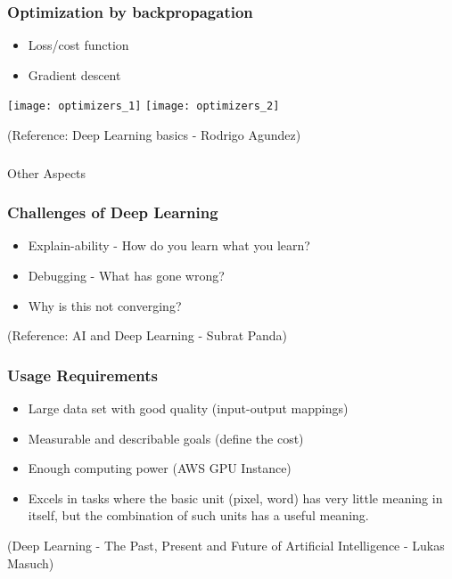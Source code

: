 \begin{frame}[fragile] \frametitle{Optimization by backpropagation}
\begin{itemize}
\item Loss/cost function
\item Gradient descent
\end{itemize}

\begin{center}
\texttt{[image: optimizers\_1]}
\texttt{[image: optimizers\_2]}
\end{center}

\tiny{(Reference: Deep Learning basics - Rodrigo Agundez)}

\end{frame}

\begin{frame}[fragile]\frametitle{}
\begin{center}
{\Large Other Aspects}
\end{center}
\end{frame}

\begin{frame}[fragile] \frametitle{Challenges of Deep Learning}
\begin{itemize}
\item Explain-ability - How do you learn what you learn?
\item Debugging - What has gone wrong?
\item Why is this not converging?
\end{itemize}
\tiny{(Reference: AI and Deep Learning - Subrat Panda)}
\end{frame}

\begin{frame}[fragile]\frametitle{Usage Requirements}
\begin{itemize}
\item Large data set with good quality (input-output mappings)
\item Measurable and describable goals (define the cost)
\item Enough computing power (AWS GPU Instance)
\item Excels in tasks where the basic unit (pixel, word) has very little
meaning in itself, but the combination of such units has a useful
meaning.
\end{itemize}
{\tiny (Deep Learning - The Past, Present and Future of Artificial Intelligence - Lukas Masuch)}
\end{frame}



